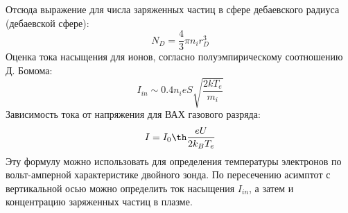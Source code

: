 \documentclass[a4paper, 12pt]{article}
\begin{document}
Отсюда выражение для числа заряженных частиц в сфере дебаевского радиуса (дебаевской сфере):
\begin{equation}
    N_{D} = \frac{4}{3}\pi n_{i}r^3_{D}
    \label{число заряженных частиц в дебаевской сфере}
\end{equation}
Оценка тока насыщения для ионов, согласно полуэмпирическому соотношению Д. Бомома:
\begin{equation}
    I_{in} \sim 0.4n_{i}eS\sqrt{\frac{2kT_{e}}{m_{i}}}
    \label{ток насыщения}
\end{equation}
Зависимость тока от напряжения для ВАХ газового разряда:
\begin{equation}
    I = I_{0}\th\frac{eU}{2k_{B}T_{e}}
    \label{зависимость тока от напряжения для двойного зонда}
\end{equation}
Эту формулу можно использовать для определения температуры электронов по вольт-амперной характеристике двойного зонда.
По пересечению асимптот с вертикальной осью можно определить ток насыщения $I_{in}$, а затем и концентрацию заряженных частиц в плазме.
\end{document}
